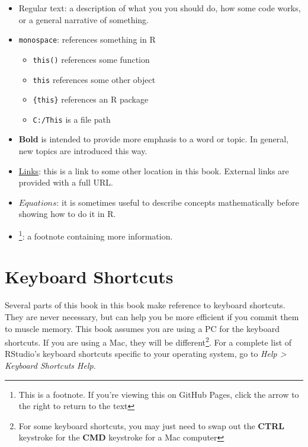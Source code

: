 \documentclass[]{book}
\providecommand{\tightlist}{%
  \setlength{\itemsep}{0pt}\setlength{\parskip}{0pt}}
\let\rmarkdownfootnote\footnote%
\def\footnote{\protect\rmarkdownfootnote}
\begin{document}
\begin{itemize}
\tightlist
\item
  Regular text: a description of what you you should do, how some code works, or a general narrative of something.
\item
  \texttt{monospace}: references something in R

  \begin{itemize}
  \tightlist
  \item
    \texttt{this()} references some function
  \item
    \texttt{this} references some other object
  \item
    \texttt{\{this\}} references an R package
  \item
    \texttt{C:/This} is a file path
  \end{itemize}
\item
  \textbf{Bold} is intended to provide more emphasis to a word or topic. In general, new topics are introduced this way.
\item
  \protect\hyperlink{notation}{Links}: this is a link to some other location in this book. External links are provided with a full URL.
\item
  \(Equations\): it is sometimes useful to describe concepts mathematically before showing how to do it in R.
\item
  \footnote{This is a footnote. If you're viewing this on GitHub Pages, click the arrow to the right to return to the text}: a footnote containing more information.
\end{itemize}

\hypertarget{keyboard-shortcuts}{%
\section*{Keyboard Shortcuts}\label{keyboard-shortcuts}}

Several parts of this book in this book make reference to keyboard shortcuts. They are never necessary, but can help you be more efficient if you commit them to muscle memory. This book assumes you are using a PC for the keyboard shortcuts. If you are using a Mac, they will be different\footnote{For some keyboard shortcuts, you may just need to swap out the \textbf{CTRL} keystroke for the \textbf{CMD} keystroke for a Mac computer}. For a complete list of RStudio's keyboard shortcuts specific to your operating system, go to \emph{Help \textgreater{} Keyboard Shortcuts Help}.
\end{document}
